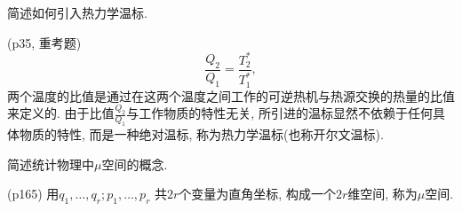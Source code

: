 \begin{questions}
\begin{solution}
  \end{solution}
  \question 简述如何引入热力学温标.
  \begin{solution}
    (p35, 重考题)
    \begin{equation}
      \frac{Q_2}{Q_1} = \frac{T_2^*}{T_1^*},
    \end{equation}
    两个温度的比值是通过在这两个温度之间工作的可逆热机与热源交换的热量的比值来定义的. 由于比值$\frac{Q_2}{Q_1}$与工作物质的特性无关, 所引进的温标显然不依赖于任何具体物质的特性, 而是一种绝对温标, 称为热力学温标(也称开尔文温标).
  \end{solution}
  \question 简述统计物理中$\mu$空间的概念.
  \begin{solution}
    (p165) 用$q_1,\dots, q_r;p_1, \dots, p_r$ 共$2r$个变量为直角坐标, 构成一个$2r$维空间, 称为$\mu$空间.
  \end{solution}
\end{questions}

